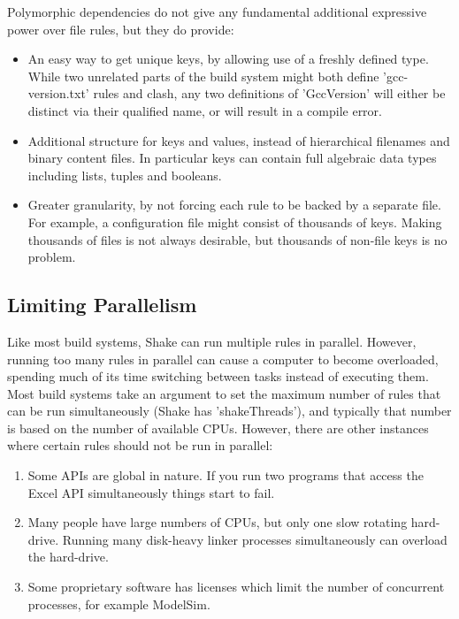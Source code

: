 Polymorphic dependencies do not give any fundamental additional expressive power over file rules, but they do provide:

\begin{itemize}
\item An easy way to get unique keys, by allowing use of a freshly defined type. While two unrelated parts of the build system might both define \lst'gcc-version.txt' rules and clash, any two definitions of \lst'GccVersion' will either be distinct via their qualified name, or will result in a compile error.
\item Additional structure for keys and values, instead of hierarchical filenames and binary content files. In particular keys can contain full algebraic data types including lists, tuples and booleans.
\item Greater granularity, by not forcing each rule to be backed by a separate file. For example, a configuration file might consist of thousands of keys. Making thousands of files is not always desirable, but thousands of non-file keys is no problem.
\end{itemize}
 
\subsection{Limiting Parallelism}

Like most build systems, Shake can run multiple rules in parallel. However, running too many rules in parallel can cause a computer to become overloaded, spending much of its time switching between tasks instead of executing them. Most build systems take an argument to set the maximum number of rules that can be run simultaneously (Shake has \lst'shakeThreads'), and typically that number is based on the number of available CPUs. However, there are other instances where certain rules should not be run in parallel:

\begin{enumerate}
\item Some APIs are global in nature. If you run two programs that access the Excel API simultaneously things start to fail.
\item Many people have large numbers of CPUs, but only one slow rotating hard-drive. Running many disk-heavy linker processes simultaneously can overload the hard-drive.
\item Some proprietary software has licenses which limit the number of concurrent processes, for example ModelSim.
\end{enumerate}

